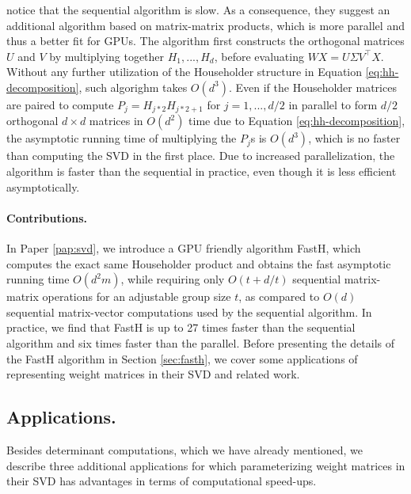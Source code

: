\documentclass[11pt,a4paper,twoside,openright,final]{memoir}
\newcommand*{\paperref}[1]{Paper \hyperref[#1]{\ref{#1}}}
\begin{document}
\citet{sequential} notice that the sequential algorithm is slow. 
As a consequence, they suggest an additional algorithm based on matrix-matrix products, which is more parallel and thus a better fit for GPUs. 
The algorithm first constructs the orthogonal matrices $U$ and $V$ by multiplying together $H_1, ..., H_d$, before evaluating $WX = U\Sigma V^\intercal X$.
Without any further utilization of the Householder structure in Equation \eqref{eq:hh-decomposition}, such algorighm takes $O(d^3)$.
Even if the Householder matrices are paired to compute $P_j = H_{j*2}H_{j*2+1}$ for $j=1, ..., d/2$ in parallel to form $d/2$ orthogonal $d\times d$ matrices in $O(d^2)$ time due to Equation \eqref{eq:hh-decomposition}, the asymptotic running time of multiplying the $P_j$s is $O(d^3)$, which is no faster than computing the SVD in the first place.
Due to increased parallelization, the algorithm is faster than the sequential in practice, even though it is less efficient asymptotically.

\paragraph{Contributions.} In \paperref{pap:svd}, we introduce a GPU friendly algorithm FastH, which computes the exact same Householder product and obtains the fast asymptotic running time $O(d^2m)$, while requiring only $O(t + d/t)$ sequential matrix-matrix operations for an adjustable group size $t$, as compared to $O(d)$ sequential matrix-vector computations used by the sequential algorithm.
In practice, we find that FastH is up to 27 times faster than the sequential algorithm and six times faster than the parallel. 
Before presenting the details of the FastH algorithm in Section \ref{sec:fasth}, we cover some applications of representing weight matrices in their SVD and related work.

\subsection{Applications.}
Besides determinant computations, which we have already mentioned, we describe three additional applications for which parameterizing weight matrices in their SVD has advantages in terms of computational speed-ups.
\end{document}
